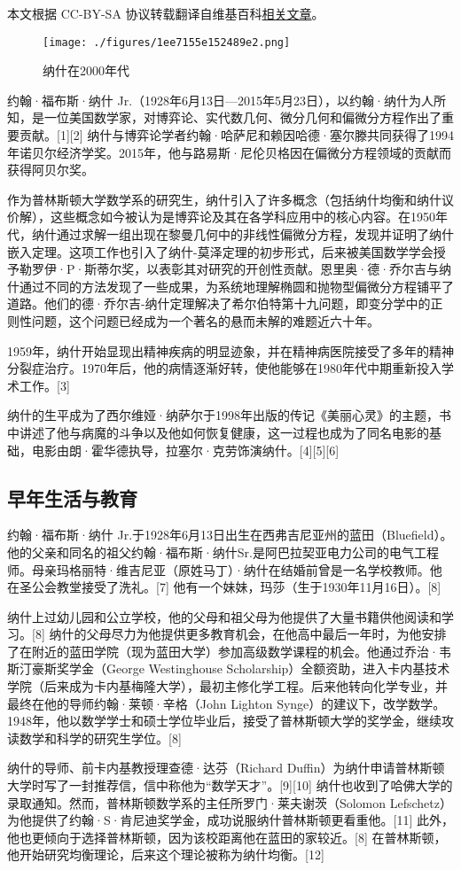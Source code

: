 
本文根据 CC-BY-SA 协议转载翻译自维基百科\href{https://en.wikipedia.org/wiki/John_Forbes_Nash_Jr.}{相关文章}。

\begin{figure}[ht]
\centering
\texttt{[image: ./figures/1ee7155e152489e2.png]}
\caption{纳什在2000年代} \label{fig_JFNJY_1}
\end{figure}
约翰·福布斯·纳什 Jr.（1928年6月13日—2015年5月23日），以约翰·纳什为人所知，是一位美国数学家，对博弈论、实代数几何、微分几何和偏微分方程作出了重要贡献。[1][2] 纳什与博弈论学者约翰·哈萨尼和赖因哈德·塞尔滕共同获得了1994年诺贝尔经济学奖。2015年，他与路易斯·尼伦贝格因在偏微分方程领域的贡献而获得阿贝尔奖。

作为普林斯顿大学数学系的研究生，纳什引入了许多概念（包括纳什均衡和纳什议价解），这些概念如今被认为是博弈论及其在各学科应用中的核心内容。在1950年代，纳什通过求解一组出现在黎曼几何中的非线性偏微分方程，发现并证明了纳什嵌入定理。这项工作也引入了纳什-莫泽定理的初步形式，后来被美国数学学会授予勒罗伊·P·斯蒂尔奖，以表彰其对研究的开创性贡献。恩里奥·德·乔尔吉与纳什通过不同的方法发现了一些成果，为系统地理解椭圆和抛物型偏微分方程铺平了道路。他们的德·乔尔吉-纳什定理解决了希尔伯特第十九问题，即变分学中的正则性问题，这个问题已经成为一个著名的悬而未解的难题近六十年。

1959年，纳什开始显现出精神疾病的明显迹象，并在精神病医院接受了多年的精神分裂症治疗。1970年后，他的病情逐渐好转，使他能够在1980年代中期重新投入学术工作。[3]

纳什的生平成为了西尔维娅·纳萨尔于1998年出版的传记《美丽心灵》的主题，书中讲述了他与病魔的斗争以及他如何恢复健康，这一过程也成为了同名电影的基础，电影由朗·霍华德执导，拉塞尔·克劳饰演纳什。[4][5][6]
\subsection{早年生活与教育}
约翰·福布斯·纳什 Jr.于1928年6月13日出生在西弗吉尼亚州的蓝田（Bluefield）。他的父亲和同名的祖父约翰·福布斯·纳什Sr.是阿巴拉契亚电力公司的电气工程师。母亲玛格丽特·维吉尼亚（原姓马丁）·纳什在结婚前曾是一名学校教师。他在圣公会教堂接受了洗礼。[7] 他有一个妹妹，玛莎（生于1930年11月16日）。[8]

纳什上过幼儿园和公立学校，他的父母和祖父母为他提供了大量书籍供他阅读和学习。[8] 纳什的父母尽力为他提供更多教育机会，在他高中最后一年时，为他安排了在附近的蓝田学院（现为蓝田大学）参加高级数学课程的机会。他通过乔治·韦斯汀豪斯奖学金（George Westinghouse Scholarship）全额资助，进入卡内基技术学院（后来成为卡内基梅隆大学），最初主修化学工程。后来他转向化学专业，并最终在他的导师约翰·莱顿·辛格（John Lighton Synge）的建议下，改学数学。1948年，他以数学学士和硕士学位毕业后，接受了普林斯顿大学的奖学金，继续攻读数学和科学的研究生学位。[8]

纳什的导师、前卡内基教授理查德·达芬（Richard Duffin）为纳什申请普林斯顿大学时写了一封推荐信，信中称他为“数学天才”。[9][10] 纳什也收到了哈佛大学的录取通知。然而，普林斯顿数学系的主任所罗门·莱夫谢茨（Solomon Lefschetz）为他提供了约翰·S·肯尼迪奖学金，成功说服纳什普林斯顿更看重他。[11] 此外，他也更倾向于选择普林斯顿，因为该校距离他在蓝田的家较近。[8] 在普林斯顿，他开始研究均衡理论，后来这个理论被称为纳什均衡。[12]